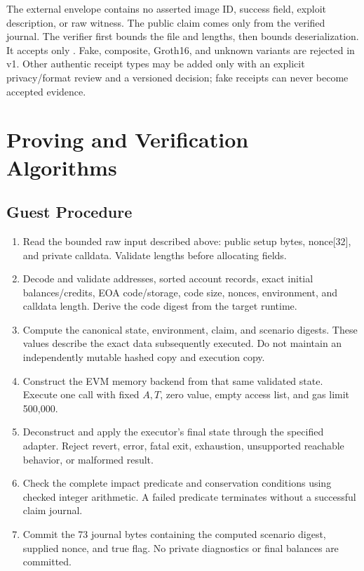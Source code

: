 \documentclass[11pt]{article}
\begin{document}
The external envelope contains no asserted image ID, success field, exploit description, or raw witness. The public claim comes only from the verified journal. The verifier first bounds the file and lengths, then bounds deserialization. It accepts only . Fake, composite, Groth16, and unknown variants are rejected in v1. Other authentic receipt types may be added only with an explicit privacy/format review and a versioned decision; fake receipts can never become accepted evidence.

\section{Proving and Verification Algorithms}
\subsection{Guest Procedure}
\begin{enumerate}
\item Read the bounded raw input described above: public setup bytes, nonce[32], and private calldata. Validate lengths before allocating fields.
\item Decode and validate addresses, sorted account records, exact initial balances/credits, EOA code/storage, code size, nonces, environment, and calldata length. Derive the code digest from the target runtime.
\item Compute the canonical state, environment, claim, and scenario digests. These values describe the exact data subsequently executed. Do not maintain an independently mutable hashed copy and execution copy.
\item Construct the EVM memory backend from that same validated state. Execute one call with fixed \(A,T\), zero value, empty access list, and gas limit 500,000.
\item Deconstruct and apply the executor's final state through the specified adapter. Reject revert, error, fatal exit, exhaustion, unsupported reachable behavior, or malformed result.
\item Check the complete impact predicate and conservation conditions using checked integer arithmetic. A failed predicate terminates without a successful claim journal.
\item Commit the 73 journal bytes containing the computed scenario digest, supplied nonce, and true flag. No private diagnostics or final balances are committed.
\end{enumerate}
\end{document}
